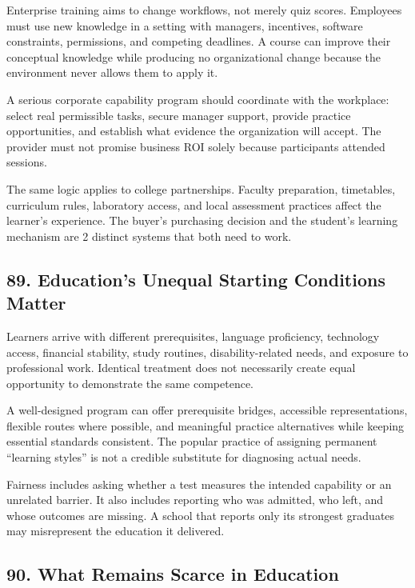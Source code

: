 Enterprise training aims to change workflows, not merely quiz scores. Employees must use new knowledge in a setting with managers, incentives, software constraints, permissions, and competing deadlines. A course can improve their conceptual knowledge while producing no organizational change because the environment never allows them to apply it.

A serious corporate capability program should coordinate with the workplace: select real permissible tasks, secure manager support, provide practice opportunities, and establish what evidence the organization will accept. The provider must not promise business ROI solely because participants attended sessions.

The same logic applies to college partnerships. Faculty preparation, timetables, curriculum rules, laboratory access, and local assessment practices affect the learner's experience. The buyer's purchasing decision and the student's learning mechanism are 2 distinct systems that both need to work.

\subsection*{89. Education's Unequal Starting Conditions Matter}

Learners arrive with different prerequisites, language proficiency, technology access, financial stability, study routines, disability-related needs, and exposure to professional work. Identical treatment does not necessarily create equal opportunity to demonstrate the same competence.

A well-designed program can offer prerequisite bridges, accessible representations, flexible routes where possible, and meaningful practice alternatives while keeping essential standards consistent. The popular practice of assigning permanent ``learning styles'' is not a credible substitute for diagnosing actual needs.

Fairness includes asking whether a test measures the intended capability or an unrelated barrier. It also includes reporting who was admitted, who left, and whose outcomes are missing. A school that reports only its strongest graduates may misrepresent the education it delivered.

\subsection*{90. What Remains Scarce in Education}

